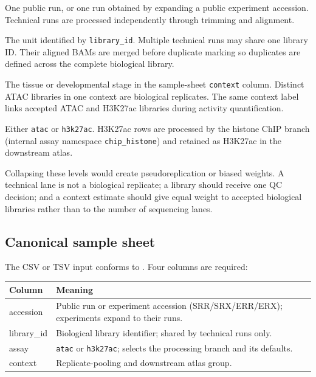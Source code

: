 \documentclass[11pt]{article}
\newcommand{\filep}[1]{\path{#1}}
\begin{document}
\begin{description}[style=nextline,leftmargin=2.2em]
  \item[Accession or technical run]
  One public run, or one run obtained by expanding a public experiment
  accession.  Technical runs are processed independently through trimming and
  alignment.

  \item[Biological library]
  The unit identified by \texttt{library\_id}.  Multiple technical runs may
  share one library ID.  Their aligned BAMs are merged before duplicate
  marking so duplicates are defined across the complete biological library.

  \item[Context]
  The tissue or developmental stage in the sample-sheet \texttt{context}
  column.  Distinct ATAC libraries in one context are biological replicates.
  The same context label links accepted ATAC and H3K27ac libraries during
  activity quantification.

  \item[Assay]
  Either \texttt{atac} or \texttt{h3k27ac}.  H3K27ac rows are processed by the
  histone ChIP branch (internal assay namespace \texttt{chip\_histone}) and
  retained as H3K27ac in the downstream atlas.
\end{description}

Collapsing these levels would create pseudoreplication or biased weights.  A
technical lane is not a biological replicate; a library should receive one
QC decision; and a context estimate should give equal weight to accepted
biological libraries rather than to the number of sequencing lanes.

\subsection{Canonical sample sheet}

The CSV or TSV input conforms to
\filep{schemas/sample-sheet.schema.yaml}.  Four columns are required:

\begin{center}
\begin{tabularx}{0.94\textwidth}{>{\ttfamily}l X}
\toprule
\normalfont Column & Meaning \\
\midrule
accession & Public run or experiment accession (SRR/SRX/ERR/ERX); experiments expand to their runs. \\
library\_id & Biological library identifier; shared by technical runs only. \\
assay & \texttt{atac} or \texttt{h3k27ac}; selects the processing branch and its defaults. \\
context & Replicate-pooling and downstream atlas group. \\
\bottomrule
\end{tabularx}
\end{center}
\end{document}
